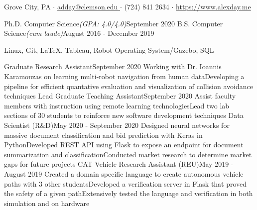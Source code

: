\documentclass[letter]{article}
\begin{document}
        \vspace*{-40pt}

         {Grove City, PA $\cdot$ \href{mailto://adday@clemson.edu}{\underline{adday@clemson.edu }} $\cdot$ (724) 841 2634 $\cdot$ \href{https://www.alexday.me} {\underline{https://www.alexday.me}}}

		     {Ph.D. Computer Science}{\textit{(GPA: 4.0/4.0)}}{September 2020}
		    \vspace{\interspace}
		     {B.S. Computer Science}{\textit{(cum laude)}}{August 2016 - December 2019}
		    \vspace{\interspace}
	    \vspace{-\interspace}



              {Linux, Git, \LaTeX, Tableau, Robot Operating System/Gazebo, SQL} 


                    {Graduate Research Assistant}{September 2020}
                    {Working with Dr. Ioannis Karamouzas on learning multi-robot navigation from human data}{Developing a pipeline for efficient quantative evaluation and visualization of collision avoidance techniques}
		    \vspace{\interspace}
                    {Lead Graduate Teaching Assistant}{September 2020}
                    {Assist faculty members with instruction using remote learning technologies}{Lead two lab sections of 30 students to reinforce new software development techniques}
		    \vspace{\interspace}
                    {Data Scientist (R\&D)}{May 2020 - September 2020}
                    {Designed neural networks for massive document classification and bid prediction with Keras in Python}{Developed REST API using Flask to expose an endpoint for document summarization and classification}{Conducted market research to determine market gaps for future projects}
		    \vspace{\interspace}
                    {CAT Vehicle Research Assistant (REU)}{May 2019 - August 2019}
                    {Created a domain specific language to create autonomous vehicle paths with 3 other students}{Developed a verification server in Flask that proved the safety of a given path}{Extensively tested the language and verification in both simulation and on hardware}
		    \vspace{\interspace}
	    \vspace{-\interspace}
\end{document}
